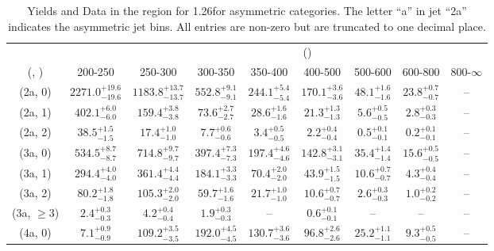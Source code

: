\begin{table}[h!]
\tiny
\centering
\caption{Yields and Data in the \mj region for 1.26\ifb for asymmetric categories. The letter ``a'' in jet \eg ``2a''  indicates the asymmetric jet bins. All entries are non-zero but are truncated to one decimal place.\label{tab:yieldsnodata_mu_comb_asym}}
\begin{tabular}
{ccccccccc}
	\hline\hline
&	& \multicolumn{8}{c}{\scalht (\gev)} \\ 
	 (\njet,  \nb) & 200-250 & 250-300 & 300-350 & 350-400 & 400-500 & 500-600 & 600-800 & 800-$\infty$ \\ [0.8ex] 
\hline
	(2a, 0) & $2271.0^{+ 19.6 }_{- 19.6 }$ & $1183.8^{+ 13.7 }_{- 13.7 }$ & $552.8^{+ 9.1 }_{- 9.1 }$ & $244.1^{+ 5.4 }_{- 5.4 }$ & $170.1^{+ 3.6 }_{- 3.6 }$ & $48.1^{+ 1.6 }_{- 1.6 }$ & $23.8^{+ 0.7 }_{- 0.7 }$ & -- \\[0.5ex] 
	(2a, 1) & $402.1^{+ 6.0 }_{- 6.0 }$ & $159.4^{+ 3.8 }_{- 3.8 }$ & $73.6^{+ 2.7 }_{- 2.7 }$ & $28.6^{+ 1.6 }_{- 1.6 }$ & $21.3^{+ 1.3 }_{- 1.3 }$ & $5.6^{+ 0.5 }_{- 0.5 }$ & $2.8^{+ 0.3 }_{- 0.3 }$ & -- \\[0.5ex] 
	(2a, 2) & $38.5^{+ 1.5 }_{- 1.5 }$ & $17.4^{+ 1.0 }_{- 1.0 }$ & $7.7^{+ 0.6 }_{- 0.6 }$ & $3.4^{+ 0.5 }_{- 0.5 }$ & $2.2^{+ 0.4 }_{- 0.4 }$ & $0.5^{+ 0.1 }_{- 0.1 }$ & $0.2^{+ 0.1 }_{- 0.1 }$ & -- \\[0.5ex] 
	(3a, 0) & $534.5^{+ 8.7 }_{- 8.7 }$ & $714.8^{+ 9.7 }_{- 9.7 }$ & $397.4^{+ 7.3 }_{- 7.3 }$ & $197.4^{+ 4.6 }_{- 4.6 }$ & $142.8^{+ 3.1 }_{- 3.1 }$ & $35.4^{+ 1.4 }_{- 1.4 }$ & $15.6^{+ 0.5 }_{- 0.5 }$ & -- \\[0.5ex] 
	(3a, 1) & $294.4^{+ 4.0 }_{- 4.0 }$ & $361.4^{+ 4.4 }_{- 4.4 }$ & $184.1^{+ 3.3 }_{- 3.3 }$ & $70.4^{+ 2.0 }_{- 2.0 }$ & $43.9^{+ 1.5 }_{- 1.5 }$ & $10.6^{+ 0.7 }_{- 0.7 }$ & $4.3^{+ 0.4 }_{- 0.4 }$ & -- \\[0.5ex] 
	(3a, 2) & $80.2^{+ 1.8 }_{- 1.8 }$ & $105.3^{+ 2.0 }_{- 2.0 }$ & $59.7^{+ 1.6 }_{- 1.6 }$ & $21.7^{+ 1.0 }_{- 1.0 }$ & $10.6^{+ 0.7 }_{- 0.7 }$ & $2.6^{+ 0.3 }_{- 0.3 }$ & $1.0^{+ 0.2 }_{- 0.2 }$ & -- \\[0.5ex] 
	(3a, $\ge3$) & $2.4^{+ 0.3 }_{- 0.3 }$ & $4.2^{+ 0.4 }_{- 0.4 }$ & $1.9^{+ 0.3 }_{- 0.3 }$ & -- & $0.6^{+ 0.1 }_{- 0.1 }$ & -- & -- & -- \\[0.5ex] 
	(4a, 0) & $7.1^{+ 0.9 }_{- 0.9 }$ & $109.2^{+ 3.5 }_{- 3.5 }$ & $192.0^{+ 4.5 }_{- 4.5 }$ & $130.7^{+ 3.6 }_{- 3.6 }$ & $96.8^{+ 2.6 }_{- 2.6 }$ & $25.2^{+ 1.1 }_{- 1.1 }$ & $9.3^{+ 0.5 }_{- 0.5 }$ & -- \\[0.5ex] 

\end{tabular}
\end{table}
